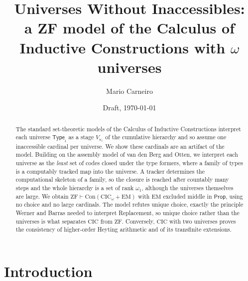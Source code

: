 \documentclass[10pt]{article}
\newcommand{\Prop}{\mathsf{Prop}}
\newcommand{\Type}{\mathsf{Type}}
\newcommand{\CIC}{\mathrm{CIC}}
\newcommand{\ZF}{\mathrm{ZF}}
\newcommand{\EM}{\mathrm{EM}}
\newcommand{\Con}{\mathrm{Con}}
\begin{document}
\title{Universes Without Inaccessibles:\\
  \large a ZF model of the Calculus of Inductive Constructions with $\omega$ universes}
\author{Mario Carneiro}
\date{Draft, \today}
\maketitle

\noindent{}

\begin{abstract}
The standard set-theoretic models of the Calculus of Inductive Constructions
interpret each universe $\Type_i$ as a stage $V_{\kappa_i}$ of the cumulative
hierarchy and so assume one inaccessible cardinal per universe. We show these
cardinals are an artifact of the model. Building on the assembly model of van
den Berg and Otten, we interpret each universe as the \emph{least} set of
codes closed under the type formers, where a family of types is a computably
tracked map into the universe. A tracker determines the computational
skeleton of a family, so the closure is reached after countably many steps
and the whole hierarchy is a set of rank $\omega_1$, although the universes
themselves are large. We obtain
$\ZF\vdash\Con(\CIC_\omega+\EM)$ with $\EM$ excluded middle in $\Prop$, using
no choice and no large cardinals. The model refutes unique choice, exactly
the principle Werner and Barras needed to interpret Replacement, so unique
choice rather than the universes is what separates $\CIC$ from $\ZF$.
Conversely, $\CIC$ with two universes proves the consistency of higher-order
Heyting arithmetic and of its transfinite extensions.
\end{abstract}

\section{Introduction}
\end{document}
